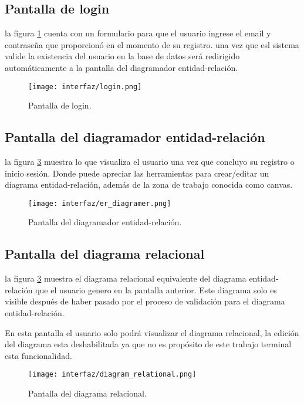 \subsection{Pantalla de login}

la figura \ref{img:app_login} cuenta con un formulario para que el usuario ingrese el email y contraseña que proporcionó en el momento de su registro. una vez que esl sistema valide la existencia del usuario en la base de datos será redirigido automáticamente a la pantalla del diagramador entidad-relación.

\begin{figure}[H]
    \centering
    \texttt{[image: interfaz/login.png]}
    \caption{Pantalla de login.}
    \label{img:app_login}
\end{figure}


\subsection{Pantalla del diagramador entidad-relación}

la figura \ref{img:app_diagrammerER} muestra lo que visualiza el usuario una vez que concluyo su registro o inicio sesión. Donde puede apreciar las herramientas para crear/editar un diagrama entidad-relación, además de la zona de trabajo conocida como canvas.

\begin{figure}[H]
    \centering
    \texttt{[image: interfaz/er\_diagramer.png]}
    \caption{Pantalla del diagramador entidad-relación.}
    \label{img:app_diagrammerER}
\end{figure}

\subsection{Pantalla del diagrama relacional}

la figura \ref{img:app_diagrammerER} muestra el diagrama relacional equivalente del diagrama entidad-relación que el usuario genero en la pantalla anterior. Este diagrama solo es visible después de haber pasado por el proceso de validación para el diagrama entidad-relación.


En esta pantalla el usuario solo podrá visualizar el diagrama relacional, la edición del diagrama esta deshabilitada ya que no es propósito de este trabajo terminal esta funcionalidad.

\begin{figure}[H]
    \centering
    \texttt{[image: interfaz/diagram\_relational.png]}
    \caption{Pantalla del diagrama relacional.}
    \label{img:app_diagrammerER}
\end{figure}

